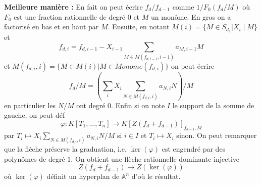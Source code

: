 \documentclass[a4paper,12pt]{book}
\newcommand{\A}{\mathbb{A}}
\theoremstyle{plain}
\theoremstyle{definition}
\theoremstyle{remark}
\begin{document}
\textbf{Meilleure manière :} En fait on peut écrire $f_d/f_{d-1}$ comme
$1/F_0(f_d/M)$ où $F_0$ est une fraction rationnelle de degré $0$ et
$M$ un monôme. En gros on a factorisé en bas et en haut par $M$. Ensuite,
en notant $M(i)=\{M\in S_{d_1}| X_i\mid M\}$ et \[f_{d,i}= f_{d,i-1}-
X_{i-1}\sum_{M\in M(f_{d,i-1},i-1)} a_{M, i-1}M\] et $M(f_{d,i},i)=\{M\in M(i)| M\in Monome(f_{d,i})\}$
on peut écrire
\[f_d/M=\left(\sum_i X_i\sum_{N\in M(f_{d,i}, i)} a_{N, i} N\right)/M\]
en particulier les $N/M$ ont degré $0$. Enfin si on note $I$ le support 
de la somme de gauche, on peut déf 
\[\varphi\colon K[T_1,\ldots,T_n]\to K[Z(f_d+f_{d-1})]_{f_{d-1}, M}\]
par $T_i\mapsto X_i\sum_{N\in M(f_{d,i}, i)} a_{N, i} N/M$ si $i\in I$
et $T_i\mapsto X_i$ sinon. On peut remarquer que la flèche préserve la 
graduation, i.e. $\ker(\varphi)$ est engendré par des polynômes de degré
$1$. On obtient une flèche rationnelle dominante injective
\[Z(f_d+f_{d-1})\to Z(\ker(\varphi))\]
où $\ker(\varphi)$ définit un hyperplan de $\A^n$ d'où le résultat.

\printbibliography
\end{document}
